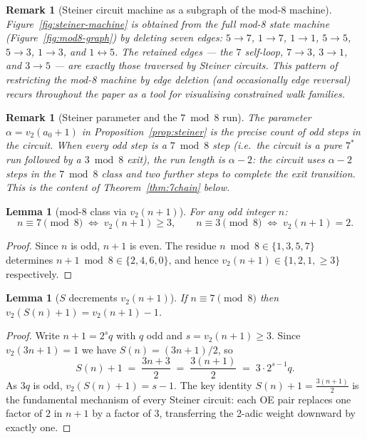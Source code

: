 \documentclass[11pt,a4paper]{article}
\newtheorem{lemma}[theorem]{Lemma}
\theoremstyle{remark}
\theoremstyle{plain}
\newtheorem{remark}[theorem]{Remark}
\begin{document}
\begin{remark}[Steiner circuit machine as a subgraph of the mod-8 machine]
Figure~\ref{fig:steiner-machine} is obtained from the full mod-8 state machine
(Figure~\ref{fig:mod8-graph}) by deleting seven edges:
$5\to7$, $1\to7$, $1\to1$, $5\to5$, $5\to3$, $1\to3$, and $1\leftrightarrow5$.
The retained edges --- the $7$ self-loop, $7\to3$, $3\to1$, and $3\to5$ --- are
exactly those traversed by Steiner circuits.
This pattern of restricting the mod-8 machine by edge deletion (and occasionally
edge reversal) recurs throughout the paper as a tool for visualising constrained
walk families.
\end{remark}

\begin{remark}[Steiner parameter and the $7 \bmod 8$ run]
\label{rem:steiner-7run}
The parameter $\alpha = v_2(a_0+1)$ in Proposition~\ref{prop:steiner} is the
\emph{precise} count of odd steps in the circuit.
When every odd step is a $7 \bmod 8$ step (i.e.\ the circuit is a pure $7^*$ run
followed by a $3 \bmod 8$ exit), the run length is $\alpha - 2$: the circuit uses
$\alpha - 2$ steps in the $7 \bmod 8$ class and two further steps to complete
the exit transition.
This is the content of Theorem~\ref{thm:7chain} below.
\end{remark}

\begin{lemma}[mod-8 class via $v_2(n+1)$]
\label{lem:mod8-v2}
For any odd integer $n$:
\[
  n \equiv 7 \pmod{8} \;\iff\; v_2(n+1) \ge 3,
  \qquad
  n \equiv 3 \pmod{8} \;\iff\; v_2(n+1) = 2.
\]
\end{lemma}
\begin{proof}
Since $n$ is odd, $n+1$ is even.
The residue $n \bmod 8 \in \{1,3,5,7\}$ determines $n+1 \bmod 8 \in \{2,4,6,0\}$,
and hence $v_2(n+1) \in \{1,2,1,\ge 3\}$ respectively.
\end{proof}

\begin{lemma}[$S$ decrements $v_2(n+1)$]
\label{lem:S-decrement}
If $n \equiv 7 \pmod{8}$ then $v_2(S(n)+1) = v_2(n+1) - 1$.
\end{lemma}
\begin{proof}
Write $n + 1 = 2^s q$ with $q$ odd and $s = v_2(n+1) \ge 3$.
Since $v_2(3n+1) = 1$ we have $S(n) = (3n+1)/2$, so
\[
  S(n) + 1 \;=\; \frac{3n+3}{2} \;=\; \frac{3(n+1)}{2} \;=\; 3 \cdot 2^{s-1} q.
\]
As $3q$ is odd, $v_2(S(n)+1) = s-1$.
The key identity $S(n)+1 = \tfrac{3(n+1)}{2}$ is the fundamental mechanism of
every Steiner circuit: each OE pair replaces one factor of $2$ in $n+1$ by a
factor of $3$, transferring the 2-adic weight downward by exactly one.
\end{proof}
\end{document}
